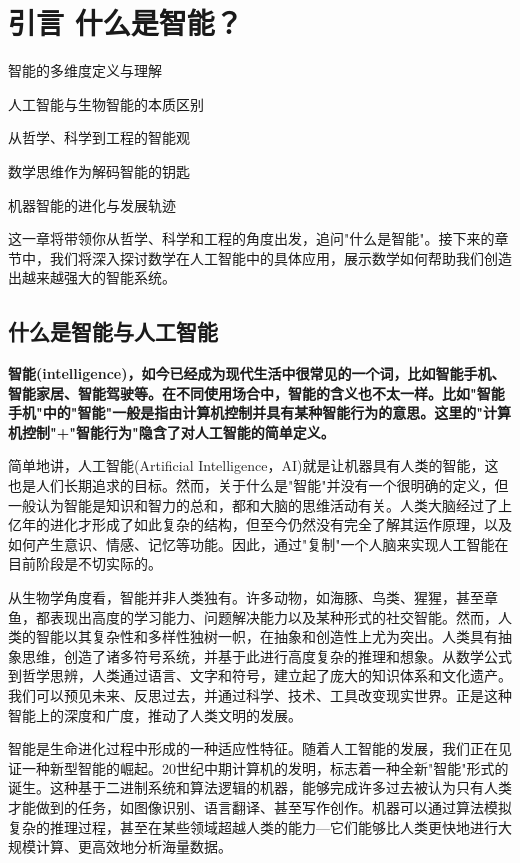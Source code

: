\chapter{ 引言 什么是智能？}
 \begin{introduction}
  \item 智能的多维度定义与理解
  \item 人工智能与生物智能的本质区别
  \item 从哲学、科学到工程的智能观
  \item 数学思维作为解码智能的钥匙
  \item 机器智能的进化与发展轨迹
\end{introduction}


这一章将带领你从哲学、科学和工程的角度出发，追问"什么是智能"。接下来的章节中，我们将深入探讨数学在人工智能中的具体应用，展示数学如何帮助我们创造出越来越强大的智能系统。

\section{什么是智能与人工智能}

{\textbf{智能(intelligence)，如今已经成为现代生活中很常见的一个词，比如智能手机、智能家居、智能驾驶等。在不同使用场合中，智能的含义也不太一样。比如"智能手机"中的"智能"一般是指由计算机控制并具有某种智能行为的意思。这里的"计算机控制"+"智能行为"隐含了对人工智能的简单定义。}}

简单地讲，人工智能(Artificial Intelligence，AI)就是让机器具有人类的智能，这也是人们长期追求的目标。然而，关于什么是"智能"并没有一个很明确的定义，但一般认为智能是知识和智力的总和，都和大脑的思维活动有关。人类大脑经过了上亿年的进化才形成了如此复杂的结构，但至今仍然没有完全了解其运作原理，以及如何产生意识、情感、记忆等功能。因此，通过"复制"一个人脑来实现人工智能在目前阶段是不切实际的。

从生物学角度看，智能并非人类独有。许多动物，如海豚、鸟类、猩猩，甚至章鱼，都表现出高度的学习能力、问题解决能力以及某种形式的社交智能。然而，人类的智能以其复杂性和多样性独树一帜，在抽象和创造性上尤为突出。人类具有抽象思维，创造了诸多符号系统，并基于此进行高度复杂的推理和想象。从数学公式到哲学思辨，人类通过语言、文字和符号，建立起了庞大的知识体系和文化遗产。我们可以预见未来、反思过去，并通过科学、技术、工具改变现实世界。正是这种智能上的深度和广度，推动了人类文明的发展。

智能是生命进化过程中形成的一种适应性特征。随着人工智能的发展，我们正在见证一种新型智能的崛起。20世纪中期计算机的发明，标志着一种全新"智能"形式的诞生。这种基于二进制系统和算法逻辑的机器，能够完成许多过去被认为只有人类才能做到的任务，如图像识别、语言翻译、甚至写作创作。机器可以通过算法模拟复杂的推理过程，甚至在某些领域超越人类的能力---它们能够比人类更快地进行大规模计算、更高效地分析海量数据。

